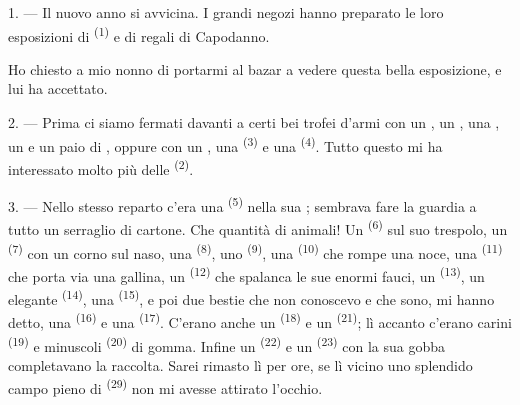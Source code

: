 \VUsaut{4.0mm}
\VUsaut{2.0mm}
\VUsaut{3.4mm}

1. --- Il nuovo anno si avvicina. I grandi negozi hanno preparato le loro esposizioni
di  \textsuperscript{(1)} e di regali di Capodanno.

Ho chiesto a mio nonno di portarmi al bazar a vedere questa bella esposizione, e lui
ha accettato.

2. --- Prima ci siamo fermati davanti a certi bei trofei d'armi con un ,
un , una , un  e un
paio di , oppure con un , una 
\textsuperscript{(3)} e una  \textsuperscript{(4)}. Tutto questo mi ha
interessato molto più delle  \textsuperscript{(2)}.

\VUsaut{3.0mm}
\VUsaut{2.6mm}

3. --- Nello stesso reparto c'era una  \textsuperscript{(5)} nella
sua ; sembrava fare la guardia a tutto un serraglio di cartone. Che
quantità di animali! Un  \textsuperscript{(6)} sul suo trespolo, un
 \textsuperscript{(7)} con un corno sul naso, una 
\textsuperscript{(8)}, uno  \textsuperscript{(9)}, una
 \textsuperscript{(10)} che rompe una noce, una 
\textsuperscript{(11)} che porta via una gallina, un 
\textsuperscript{(12)} che spalanca le sue enormi fauci, un 
\textsuperscript{(13)}, un elegante  \textsuperscript{(14)}, una
 \textsuperscript{(15)}, e poi due bestie che non conoscevo e che sono,
mi hanno detto, una  \textsuperscript{(16)} e una 
\textsuperscript{(17)}. C'erano anche un  \textsuperscript{(18)} e un
 \textsuperscript{(21)}; lì accanto c'erano carini 
\textsuperscript{(19)} e minuscoli  \textsuperscript{(20)} di gomma.
Infine un  \textsuperscript{(22)} e un 
\textsuperscript{(23)} con la sua gobba completavano la raccolta. Sarei rimasto lì per
ore, se lì vicino uno splendido campo pieno di 
\textsuperscript{(29)} non mi avesse attirato l'occhio.

